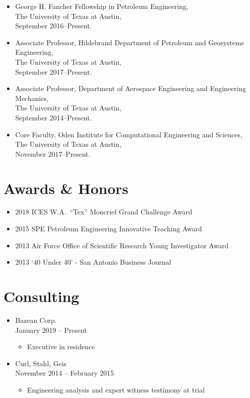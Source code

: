 \begin{itemize}
    \item George H. Fancher Fellowship in Petroleum Engineering, \\ 
          The University of Texas at Austin, \\
          September 2016--Present. 

    \item Associate Professor, Hildebrand Department of Petroleum and Geosystems Engineering, \\ 
          The University of Texas at Austin, \\
          September 2017--Present. 

      \item Associate Professor, Department of Aerospace Engineering and Engineering Mechanics, \\ 
          The University of Texas at Austin, \\
          September 2014--Present. 

    \item Core Faculty, Oden Institute for Computational Engineering and Sciences, \\ 
          The University of Texas at Austin, \\
          November 2017--Present. 
\end{itemize}
\fi

\section*{Awards \& Honors}

\begin{itemize}
    \item 2018 ICES W.A.\ ``Tex'' Moncrief Grand Challenge Award
    \item 2015 SPE Petroleum Engineering Innovative Teaching Award 
    \item 2013 Air Force Office of Scientific Research Young Investigator Award
    \item 2013 `40 Under 40' - San Antonio Business Journal
\end{itemize}


\ifdefined\ispdf
\section*{Consulting}

\begin{itemize}
    \item Bazean Corp. \\
          January 2019 -- Present
    \begin{itemize}
        \item Executive in residence
    \end{itemize}
    \item Curl, Stahl, Geis \\
          November 2014 -- February 2015
    \begin{itemize}
        \item Engineering analysis and expert witness testimony at trial
    \end{itemize}
\end{itemize}
\fi
\fi
